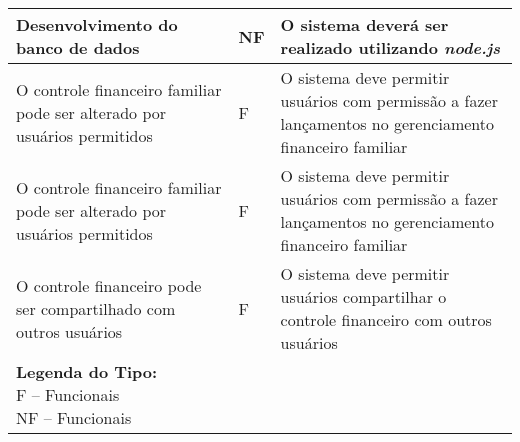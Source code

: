 \begin{longtable}[h!]{ | p{4.5cm} | l | p{8cm} | }
    Desenvolvimento do banco de dados  & NF & O sistema deverá ser realizado utilizando \textit{node.js} \\ \hline

    O controle financeiro familiar pode ser alterado por usuários permitidos & F & O sistema deve permitir usuários com permissão a fazer lançamentos no gerenciamento financeiro familiar \\ \hline

    O controle financeiro familiar pode ser alterado por usuários permitidos & F & O sistema deve permitir usuários com permissão a fazer lançamentos no gerenciamento financeiro familiar \\ \hline

    O controle financeiro pode ser compartilhado com outros usuários & F & O sistema deve permitir usuários compartilhar o controle financeiro com outros usuários \\ \hline

    
    \caption*{\textbf{Legenda do Tipo:} \\
    F – Funcionais \\
    NF – Funcionais}

\end{longtable}


